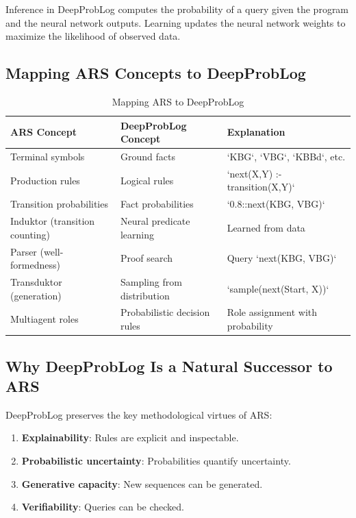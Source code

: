 \documentclass[12pt,a4paper]{article}
\begin{document}
Inference in DeepProbLog computes the probability of a query given the program 
and the neural network outputs. Learning updates the neural network weights to 
maximize the likelihood of observed data.

\subsection{Mapping ARS Concepts to DeepProbLog}

\begin{table}[H]
\centering
\caption{Mapping ARS to DeepProbLog}
\label{tab:mapping}
\begin{tabular}{@{} p{4cm} p{4cm} p{4cm} @{}}
\toprule
\textbf{ARS Concept} & \textbf{DeepProbLog Concept} & \textbf{Explanation} \\
\midrule
Terminal symbols & Ground facts & `KBG`, `VBG`, `KBBd`, etc. \\
Production rules & Logical rules & `next(X,Y) :- transition(X,Y)` \\
Transition probabilities & Fact probabilities & `0.8::next(KBG, VBG)` \\
Induktor (transition counting) & Neural predicate learning & Learned from data \\
Parser (well-formedness) & Proof search & Query `next(KBG, VBG)` \\
Transduktor (generation) & Sampling from distribution & `sample(next(Start, X))` \\
Multiagent roles & Probabilistic decision rules & Role assignment with probability \\
\bottomrule
\end{tabular}
\end{table}

\subsection{Why DeepProbLog Is a Natural Successor to ARS}

DeepProbLog preserves the key methodological virtues of ARS:

\begin{enumerate}
    \item \textbf{Explainability}: Rules are explicit and inspectable.
    \item \textbf{Probabilistic uncertainty}: Probabilities quantify uncertainty.
    \item \textbf{Generative capacity}: New sequences can be generated.
    \item \textbf{Verifiability}: Queries can be checked.
\end{enumerate}
\end{document}
